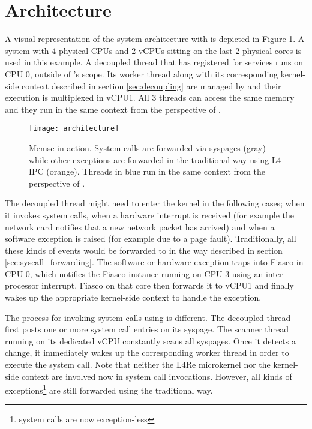 \section{Architecture}

A visual representation of the system architecture with \memsc is depicted in
Figure \ref{fig:architecture}. A system with 4 physical CPUs and 2 vCPUs
sitting on the last 2 physical cores is used in this example. A decoupled
thread that has registered for \memsc services runs on CPU 0, outside of
\llinux's scope. Its \memsc worker thread along with its corresponding
kernel-side context described in section \ref{sec:decoupling} are managed by
\llinux and their execution is multiplexed in vCPU1. All 3 threads can access
the same memory and they run in the same context from the perspective of
\llinux.

\begin{figure}[h]
\centering
\texttt{[image: architecture]}
  \caption{Memsc in action. System calls are forwarded via syspages (gray)
  while other exceptions are forwarded in the traditional way using L4 IPC
  (orange). Threads in blue run in the same context from the perspective of
  \llinux. }
\label{fig:architecture}
\end{figure}

The decoupled thread might need to enter the \llinux kernel in the following
cases; when it invokes system calls, when a hardware interrupt is received (for
example the network card notifies that a new network packet has arrived) and
when a software exception is raised (for example due to a page fault).
Traditionally, all these kinds of events would be forwarded to \llinux in the
way described in section \ref{sec:syscall_forwarding}. The software or hardware
exception traps into Fiasco in CPU 0, which notifies the Fiasco instance
running on CPU 3 using an inter-processor interrupt. Fiasco on that core then
forwards it to vCPU1 and finally \llinux wakes up the appropriate kernel-side
context to handle the exception.

The process for invoking system calls using \memsc is different. The decoupled
thread first posts one or more system call entries on its syspage. The scanner
thread running on its dedicated vCPU constantly scans all syspages. Once it
detects a change, it immediately wakes up the corresponding worker thread in
order to execute the system call. Note that neither the L4Re microkernel nor
the kernel-side context are involved now in system call invocations.  However,
all kinds of exceptions\footnote{ system calls are now exception-less} are
still forwarded using the traditional way.

